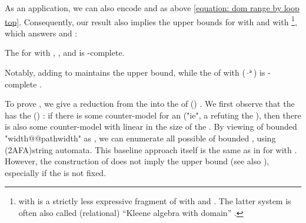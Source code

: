 \documentclass[a4paper,UKenglish,cleveref, autoref, thm-restate]{lipics-v2021}
\newcommand{\bl}{\cdot}
\begin{document}
\begin{scope}
As an application,
we can also encode  and  as above \eqref{equation: dom range by loop top}.
Consequently, our result also implies the  upper bounds for 
 with  and  with  \cite{desharnaisInternalAxiomsDomain2011,mcleanFreeKleeneAlgebras2020,sedlarKleeneAlgebraDynamic2023}\footnote{
 with  is a strictly less expressive fragment of  with  and .
The latter system is often also called (relational) ``Kleene algebra with domain'' \cite{desharnaisKleeneAlgebraDomain2006}.},
%
which answers \cite[Problem 7.3]{mcleanFreeKleeneAlgebras2020} and \cite[p.\ 16]{sedlarKleeneAlgebraDynamic2023}:
\begin{cor}\label{corollary: KA with domain PSPACE-complete}
The 
for  with , , and  is \textup{}-complete.
\end{cor}
Notably, adding  to  maintains the  upper bound,
while the  of  with  ($\bl^{\mathsf{a}}$) is -complete \cite{sedlarComplexityKleeneAlgebra2023}.

To prove ,
we give a reduction from the  into the  of  () \cite{geffertTransformingTwoWayAlternating2014}.
We first observe that the  has the \emph{} () \cite[Proposition 2.9]{nakamuraDerivativesGraphsPositive2025}:
if there is some counter-model for an  ("ie", a  refuting the ),
then there is also some counter-model with  linear in the size of the .
By viewing  of bounded "width@@pathwidth" as ,
we can enumerate all possible  of bounded , using \kl(2AFA){string automata}.
This baseline approach itself is the same as in \cite{nakamuraDerivativesGraphsPositive2025} for  with .
However,
the construction of \cite{nakamuraDerivativesGraphsPositive2025} does not imply the  upper bound (see also \cite[p.~46--47]{nakamuraDerivativesGraphsPositive2025}), especially if the  is not fixed.


\end{scope}
\end{document}
